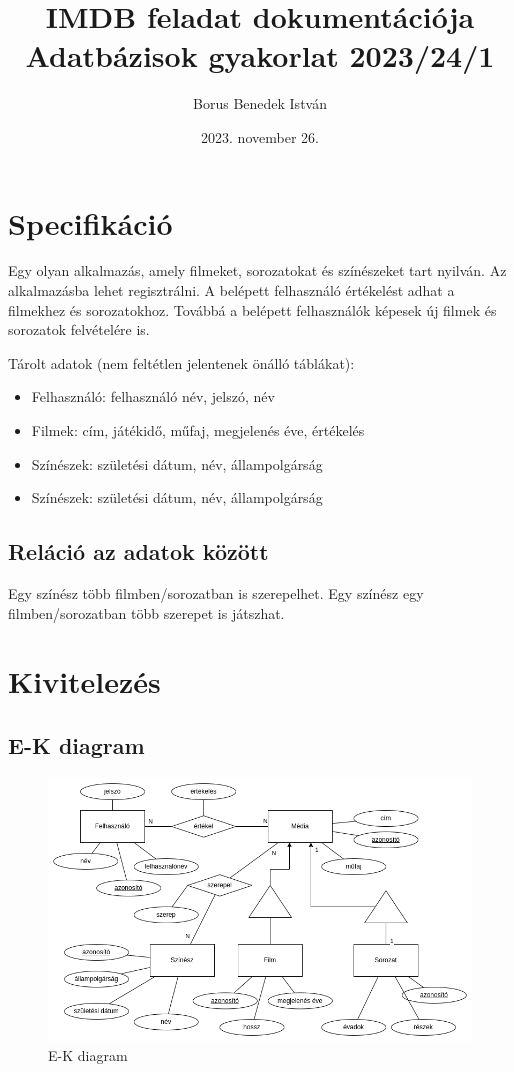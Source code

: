 \documentclass[12pt,a4paper,titlepage]{article}  %
\title{IMDB feladat dokumentációja \\ \medskip \large Adatbázisok gyakorlat 2023/24/1 }
\author{Borus Benedek István}
\date{2023. november 26.}
\begin{document}
\maketitle

\section{Specifikáció}

Egy olyan alkalmazás, amely filmeket, sorozatokat és színészeket tart nyilván. Az alkalmazásba lehet regisztrálni. A belépett felhasználó értékelést adhat a filmekhez és sorozatokhoz. Továbbá a belépett felhasználók képesek új filmek és sorozatok felvételére is.

\bigskip

\noindent Tárolt adatok (nem feltétlen jelentenek önálló táblákat): 
\begin{itemize}
	\item Felhasználó: felhasználó név, jelszó, név
	\item Filmek: cím, játékidő, műfaj, megjelenés éve, értékelés
	\item Színészek: születési dátum, név, állampolgárság 
	\item Színészek: születési dátum, név, állampolgárság
\end{itemize}

\subsection{Reláció az adatok között}

Egy színész több filmben/sorozatban is szerepelhet. Egy színész egy filmben/sorozatban több szerepet is játszhat.

\section{Kivitelezés}

\subsection{E-K diagram}

\begin{figure}[h]
	\centering
	\includegraphics[width=1\textwidth]{imdb.drawio}
	\caption{E-K diagram}
\end{figure}
\end{document}
